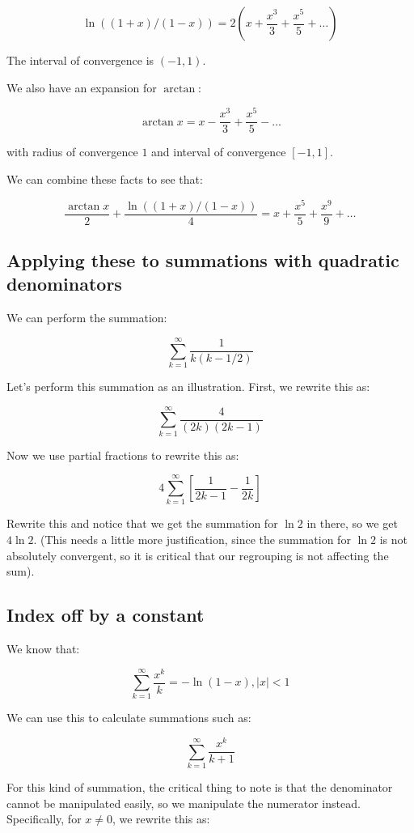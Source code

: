 \documentclass{amsart}
\begin{document}
$$\ln((1+x)/(1 - x)) = 2(x + \frac{x^3}{3} + \frac{x^5}{5} + \dots)$$

The interval of convergence is $(-1,1)$.

We also have an expansion for $\arctan$:

$$\arctan x = x - \frac{x^3}{3} + \frac{x^5}{5} - \dots$$

with radius of convergence $1$ and interval of convergence $[-1,1]$.

We can combine these facts to see that:

$$\frac{\arctan x}{2} + \frac{\ln((1 + x)/(1 - x))}{4} = x  + \frac{x^5}{5} + \frac{x^9}{9} + \dots $$

\subsection{Applying these to summations with quadratic denominators}

We can perform the summation:

$$\sum_{k=1}^\infty \frac{1}{k(k - 1/2)}$$

Let's perform this summation as an illustration. First, we rewrite this as:

$$\sum_{k=1}^\infty \frac{4}{(2k)(2k - 1)}$$

Now we use partial fractions to rewrite this as:

$$4 \sum_{k=1}^\infty \left[\frac{1}{2k - 1} - \frac{1}{2k}\right]$$

Rewrite this and notice that we get the summation for $\ln 2$ in
there, so we get $4 \ln 2$. (This needs a little more justification,
since the summation for $\ln 2$ is not absolutely convergent, so it is
critical that our regrouping is not affecting the sum).

\subsection{Index off by a constant}

We know that:

$$\sum_{k=1}^\infty \frac{x^k}{k} = -\ln(1 - x), |x| < 1$$

We can use this to calculate summations such as:

$$\sum_{k=1}^\infty \frac{x^k}{k + 1}$$

For this kind of summation, the critical thing to note is that the
denominator cannot be manipulated easily, so we manipulate the
numerator instead. Specifically, for $x \ne 0$, we rewrite this as:
\end{document}
